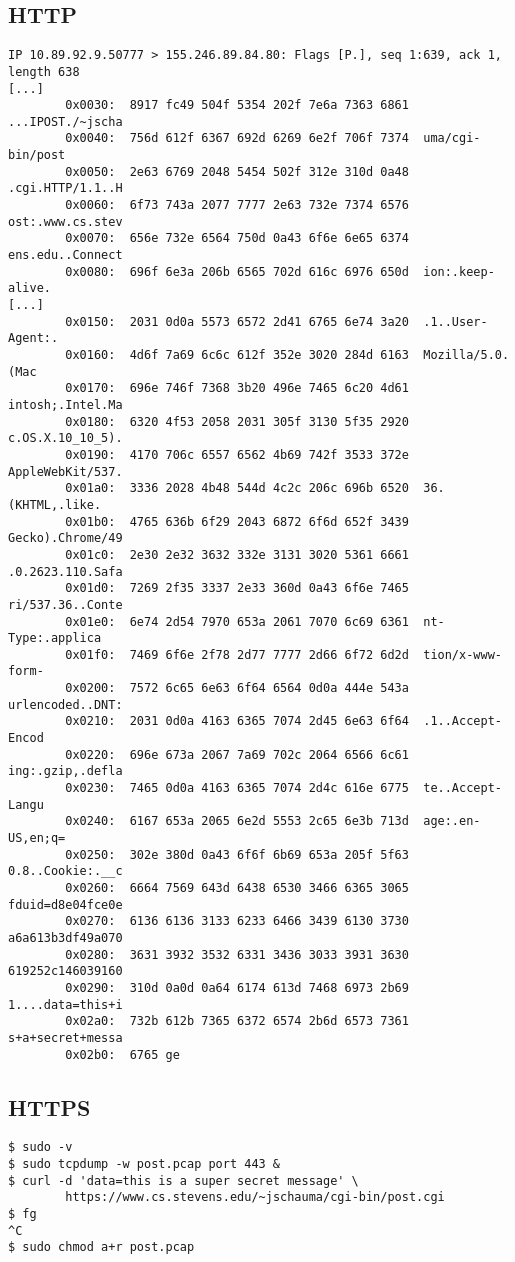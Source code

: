 \documentclass[xga]{xdvislides}
\begin{document}
\subsection{HTTP}
\small
\begin{verbatim}
IP 10.89.92.9.50777 > 155.246.89.84.80: Flags [P.], seq 1:639, ack 1, length 638
[...]
        0x0030:  8917 fc49 504f 5354 202f 7e6a 7363 6861  ...IPOST./~jscha
        0x0040:  756d 612f 6367 692d 6269 6e2f 706f 7374  uma/cgi-bin/post
        0x0050:  2e63 6769 2048 5454 502f 312e 310d 0a48  .cgi.HTTP/1.1..H
        0x0060:  6f73 743a 2077 7777 2e63 732e 7374 6576  ost:.www.cs.stev
        0x0070:  656e 732e 6564 750d 0a43 6f6e 6e65 6374  ens.edu..Connect
        0x0080:  696f 6e3a 206b 6565 702d 616c 6976 650d  ion:.keep-alive.
[...]
        0x0150:  2031 0d0a 5573 6572 2d41 6765 6e74 3a20  .1..User-Agent:.
        0x0160:  4d6f 7a69 6c6c 612f 352e 3020 284d 6163  Mozilla/5.0.(Mac
        0x0170:  696e 746f 7368 3b20 496e 7465 6c20 4d61  intosh;.Intel.Ma
        0x0180:  6320 4f53 2058 2031 305f 3130 5f35 2920  c.OS.X.10_10_5).
        0x0190:  4170 706c 6557 6562 4b69 742f 3533 372e  AppleWebKit/537.
        0x01a0:  3336 2028 4b48 544d 4c2c 206c 696b 6520  36.(KHTML,.like.
        0x01b0:  4765 636b 6f29 2043 6872 6f6d 652f 3439  Gecko).Chrome/49
        0x01c0:  2e30 2e32 3632 332e 3131 3020 5361 6661  .0.2623.110.Safa
        0x01d0:  7269 2f35 3337 2e33 360d 0a43 6f6e 7465  ri/537.36..Conte
        0x01e0:  6e74 2d54 7970 653a 2061 7070 6c69 6361  nt-Type:.applica
        0x01f0:  7469 6f6e 2f78 2d77 7777 2d66 6f72 6d2d  tion/x-www-form-
        0x0200:  7572 6c65 6e63 6f64 6564 0d0a 444e 543a  urlencoded..DNT:
        0x0210:  2031 0d0a 4163 6365 7074 2d45 6e63 6f64  .1..Accept-Encod
        0x0220:  696e 673a 2067 7a69 702c 2064 6566 6c61  ing:.gzip,.defla
        0x0230:  7465 0d0a 4163 6365 7074 2d4c 616e 6775  te..Accept-Langu
        0x0240:  6167 653a 2065 6e2d 5553 2c65 6e3b 713d  age:.en-US,en;q=
        0x0250:  302e 380d 0a43 6f6f 6b69 653a 205f 5f63  0.8..Cookie:.__c
        0x0260:  6664 7569 643d 6438 6530 3466 6365 3065  fduid=d8e04fce0e
        0x0270:  6136 6136 3133 6233 6466 3439 6130 3730  a6a613b3df49a070
        0x0280:  3631 3932 3532 6331 3436 3033 3931 3630  619252c146039160
        0x0290:  310d 0a0d 0a64 6174 613d 7468 6973 2b69  1....data=this+i
        0x02a0:  732b 612b 7365 6372 6574 2b6d 6573 7361  s+a+secret+messa
        0x02b0:  6765 ge
\end{verbatim}
\Normalsize

\subsection{HTTPS}
\begin{verbatim}
$ sudo -v
$ sudo tcpdump -w post.pcap port 443 &
$ curl -d 'data=this is a super secret message' \
        https://www.cs.stevens.edu/~jschauma/cgi-bin/post.cgi
$ fg
^C
$ sudo chmod a+r post.pcap
\end{verbatim}
\end{document}
